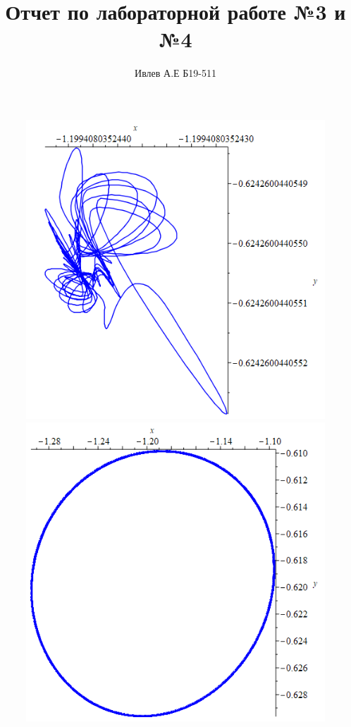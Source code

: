 \documentclass[10pt,a4paper]{article}
\title{Отчет по лабораторной работе №3 и №4}
\author{Ивлев А.Е Б19-511}
\begin{document}
	\maketitle
	
	\begin{figure}[h]
		\centering
		{\includegraphics[scale=0.2]{Lab3 f=0}}
		{\includegraphics[scale=0.2]{Lab3 f=0.1}}

\end{figure}
\end{document}
